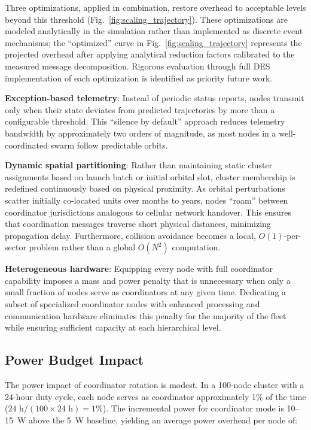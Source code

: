 \documentclass[journal]{IEEEtran}
\begin{document}
Three optimizations, applied in combination, restore overhead to acceptable levels beyond this threshold (Fig.~\ref{fig:scaling_trajectory}). These optimizations are modeled analytically in the simulation rather than implemented as discrete event mechanisms; the ``optimized'' curve in Fig.~\ref{fig:scaling_trajectory} represents the projected overhead after applying analytical reduction factors calibrated to the measured message decomposition. Rigorous evaluation through full DES implementation of each optimization is identified as priority future work.

\textbf{Exception-based telemetry}: Instead of periodic status reports, nodes transmit only when their state deviates from predicted trajectories by more than a configurable threshold. This ``silence by default'' approach reduces telemetry bandwidth by approximately two orders of magnitude, as most nodes in a well-coordinated swarm follow predictable orbits.

\textbf{Dynamic spatial partitioning}: Rather than maintaining static cluster assignments based on launch batch or initial orbital slot, cluster membership is redefined continuously based on physical proximity. As orbital perturbations scatter initially co-located units over months to years, nodes ``roam'' between coordinator jurisdictions analogous to cellular network handover. This ensures that coordination messages traverse short physical distances, minimizing propagation delay. Furthermore, collision avoidance becomes a local, $O(1)$-per-sector problem rather than a global $O(N^2)$ computation.

\textbf{Heterogeneous hardware}: Equipping every node with full coordinator capability imposes a mass and power penalty that is unnecessary when only a small fraction of nodes serve as coordinators at any given time. Dedicating a subset of specialized coordinator nodes with enhanced processing and communication hardware eliminates this penalty for the majority of the fleet while ensuring sufficient capacity at each hierarchical level.

\subsection{Power Budget Impact}

The power impact of coordinator rotation is modest. In a 100-node cluster with a 24-hour duty cycle, each node serves as coordinator approximately 1\% of the time ($24\text{~h} / (100 \times 24\text{~h}) = 1\%$). The incremental power for coordinator mode is 10--15~W above the 5~W baseline, yielding an average power overhead per node of:
\end{document}
